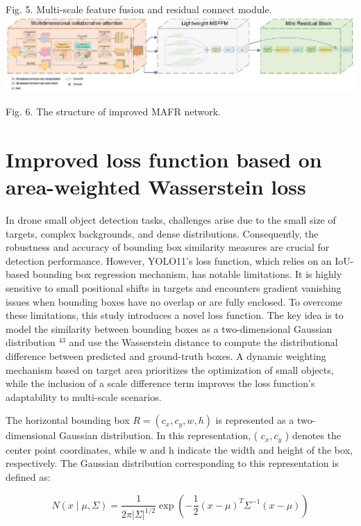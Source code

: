 \documentclass{article}
\begin{document}
Fig. 5. Multi-scale feature fusion and residual connect module.\\
\includegraphics[max width=\textwidth, center]{2025_08_05_34f8389150f57116e76bg-07}

Fig. 6. The structure of improved MAFR network.

\section*{Improved loss function based on area-weighted Wasserstein loss}
In drone small object detection tasks, challenges arise due to the small size of targets, complex backgrounds, and dense distributions. Consequently, the robustness and accuracy of bounding box similarity measures are crucial for detection performance. However, YOLO11's loss function, which relies on an IoU-based bounding box regression mechanism, has notable limitations. It is highly sensitive to small positional shifts in targets and encounters gradient vanishing issues when bounding boxes have no overlap or are fully enclosed. To overcome these limitations, this study introduces a novel loss function. The key idea is to model the similarity between bounding boxes as a two-dimensional Gaussian distribution ${ }^{43}$ and use the Wasserstein distance to compute the distributional difference between predicted and ground-truth boxes. A dynamic weighting mechanism based on target area prioritizes the optimization of small objects, while the inclusion of a scale difference term improves the loss function's adaptability to multi-scale scenarios.

The horizontal bounding box $R=\left(c_{x}, c_{y}, w, h\right)$ is represented as a two-dimensional Gaussian distribution. In this representation, ( $c_{x}, c_{y}$ ) denotes the center point coordinates, while w and h indicate the width and height of the box, respectively. The Gaussian distribution corresponding to this representation is defined as:


\begin{equation*}
N(x \mid \mu, \Sigma)=\frac{1}{2 \pi|\Sigma|^{1 / 2}} \exp \left(-\frac{1}{2}(x-\mu)^{T} \Sigma^{-1}(x-\mu)\right) \tag{10}
\end{equation*}
\end{document}
